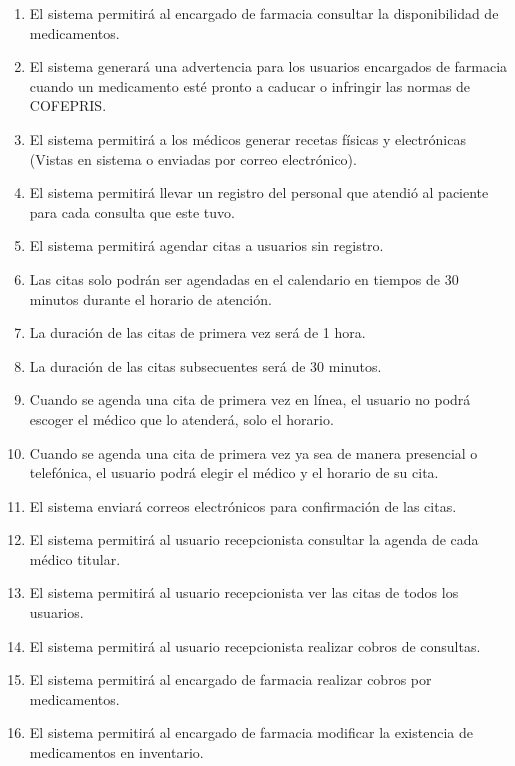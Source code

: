 \documentclass[12pt,letterpaper]{article}
\begin{document}
\begin{itemize}
\begin{enumerate}
                        \item El sistema permitirá al encargado de farmacia consultar la disponibilidad de medicamentos.
                        \item El sistema generará una advertencia para los usuarios encargados de farmacia cuando un medicamento esté pronto a caducar o infringir las normas de COFEPRIS.
                        \item El sistema permitirá a los médicos generar recetas físicas y electrónicas (Vistas en sistema o enviadas por correo electrónico).
                        \item El sistema permitirá llevar un registro del personal que atendió al paciente para cada consulta que este tuvo.
                        \item El sistema permitirá agendar citas a usuarios sin registro.
                        \item Las citas solo podrán ser agendadas en el calendario en tiempos de 30 minutos durante el horario de atención.
                        \item La duración de las citas de primera vez será de 1 hora.
                        \item La duración de las citas  subsecuentes será de 30 minutos.
                        \item Cuando se agenda una cita de primera vez en línea, el usuario no podrá escoger el médico que lo atenderá, solo el horario.
                        \item Cuando se agenda una cita de primera vez ya sea de manera presencial o telefónica, el usuario podrá elegir el médico y el horario de su cita.
                        \item El sistema enviará correos electrónicos para confirmación de las citas.
                        \item El sistema permitirá al usuario recepcionista consultar la agenda de cada médico titular.
                        \item El sistema permitirá al usuario recepcionista ver las citas de todos los usuarios.
                        \item El sistema permitirá al usuario recepcionista realizar cobros de consultas.
                        \item El sistema permitirá al encargado de farmacia realizar cobros por medicamentos.
                        \item El sistema permitirá al encargado de farmacia modificar la existencia de medicamentos en inventario.

\end{enumerate}
\end{itemize}
\end{document}
